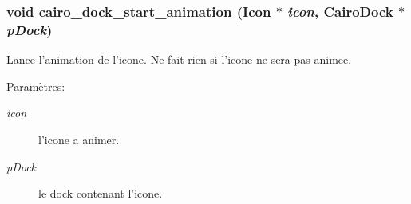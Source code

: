 \subsubsection{\setlength{\rightskip}{0pt plus 5cm}void cairo\_\-dock\_\-start\_\-animation ({\bf Icon} $\ast$ {\em icon}, {\bf CairoDock} $\ast$ {\em pDock})}\label{cairo-dock-animations_8h_551472639c25a63d7d996c7efea4960c}


Lance l'animation de l'icone. Ne fait rien si l'icone ne sera pas animee. \begin{Desc}
\item[Paramètres:]
\begin{description}
\item[{\em icon}]l'icone a animer. \item[{\em pDock}]le dock contenant l'icone. \end{description}
\end{Desc}
